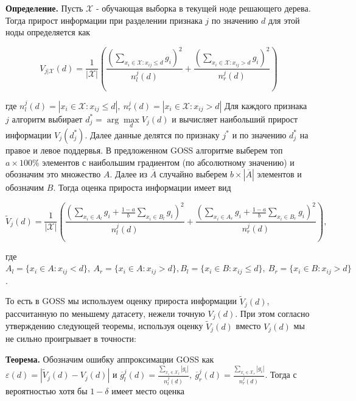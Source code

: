 \par \textbf{Определение.} Пусть $\mathcal{X}$ - обучающая выборка в текущей ноде решающего дерева. Тогда прирост информации при разделении признака $j$ по значению $d$ для этой ноды определяется как

\begin{equation*}
    V_{j|\mathcal{X}}(d) = \frac{1}{|\mathcal{X}|}\left(\frac{\left(\sum\limits_{x_i\in \mathcal{X}: x_{ij} \leqslant d}g_i\right)^2}{n^j_l(d)} + \frac{\left(\sum\limits_{x_i\in \mathcal{X}: x_{ij} > d}g_i\right)^2}{n^j_r(d)}\right)
\end{equation*}

где $n^j_l(d) = |x_i\in \mathcal{X}: x_{ij} \leqslant d|, \ n^j_r(d) = |x_i\in \mathcal{X}: x_{ij} > d|$ Для каждого признака $j$ алгоритм выбирает $d_j^* = \arg\max\limits_dV_j(d)$ и вычисляет наибольший прирост информации $V_j(d_j^*)$. Далее данные делятся по признаку $j^*$ и по значению $d_j^*$ на правое и левое поддервья. В предложенном GOSS алгоритме выберем топ $a\times100\%$ элементов с наибольшим градиентом (по абсолютному значению) и обозначим это множество $A$. Далее из $\overline{A}$ случайно выберем $b\times|\overline{A}|$ элементов и обозначим $B$. Тогда оценка прироста информации имеет вид

\begin{equation*}
    \widetilde{V}_j(d) = \frac{1}{|\mathcal{X}|}\left(\frac{\left(\sum\limits_{x_i\in A_l}g_i + \frac{1 - a}{b}\sum\limits_{x_i\in B_l}g_i\right)^2}{n^j_l(d)} + \frac{\left(\sum\limits_{x_i\in A_r}g_i + \frac{1 - a}{b}\sum\limits_{x_i\in B_r}g_i\right)^2}{n^j_r(d)}\right),
\end{equation*}

где $A_l = \{x_i \in A: x_{ij} < d\}, \ A_r = \{x_i \in A: x_{ij} > d\}, B_l = \{x_i \in B: x_{ij} \leqslant d\}, \ B_r = \{x_i \in B: x_{ij} > d\}$.

То есть в GOSS мы используем оценку прироста информации $\widetilde{V}_j(d)$, рассчитанную по меньшему датасету, нежели точную $V_j(d)$. При этом согласно утверждению следующей теоремы, используя оценку $\widetilde{V}_j(d)$ вместо $V_j(d)$ мы не сильно проигрывает в точности:

\par \textbf{Теорема.} Обозначим ошибку аппроксимации GOSS как $\varepsilon (d) = |\widetilde{V}_j(d) - V_j(d)|$ и $\overline{g}_l^j(d) = \frac{\sum\limits_{x_i \in \mathcal{X}_l}|g_i|}{n^j_l(d)}, \ \overline{g}_r^j(d) = \frac{\sum\limits_{x_i \in \mathcal{X}_r}|g_i|}{n^j_r(d)}$. Тогда с вероятностью хотя бы $1 - \delta$ имеет место оценка

